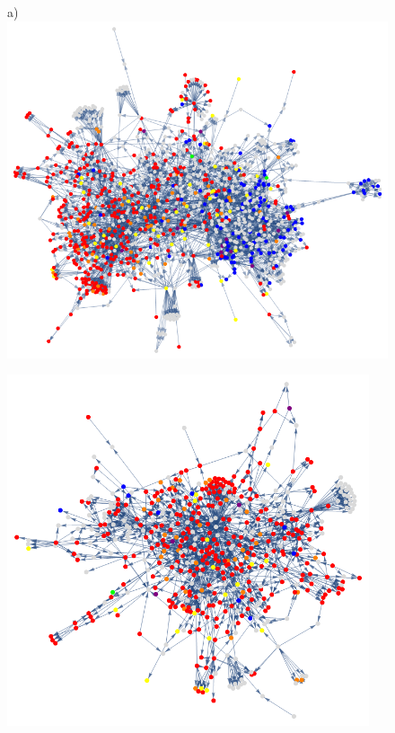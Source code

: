 \documentclass[12pt]{thesis}
\theoremstyle{plain}
\theoremstyle{definition}
\theoremstyle{remark}
\begin{document}
\begin{figure}[p]
\begin{minipage}[c]{0.7\textwidth}
a)\includegraphics[width=\textwidth]{color_coded_full.png}
\end{minipage}
\begin{minipage}[c]{0.49\textwidth}
\includegraphics[width=0.95\textwidth]{color_coded_left.png}


\end{minipage}
\end{figure}
\end{document}
